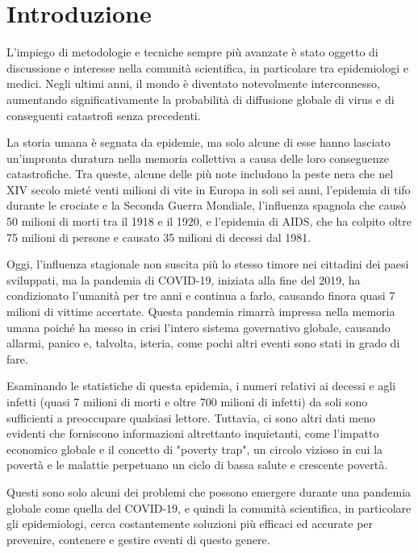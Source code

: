 \section{Introduzione}

L'impiego di metodologie e tecniche sempre più avanzate è stato oggetto 
di discussione e interesse nella comunità scientifica, in particolare tra 
epidemiologi e medici. Negli ultimi anni, il mondo è diventato notevolmente
interconnesso, aumentando significativamente la probabilità di diffusione 
globale di virus e di conseguenti catastrofi senza precedenti.

La storia umana è segnata da epidemie, ma solo alcune di esse hanno 
lasciato un'impronta duratura nella memoria collettiva a causa delle loro 
conseguenze catastrofiche. Tra queste, alcune delle più note includono la 
peste nera che nel XIV secolo mieté venti milioni di vite in Europa in 
soli sei anni, l'epidemia di tifo durante le crociate e la Seconda 
Guerra Mondiale, l'influenza spagnola che causò 50 milioni di morti tra 
il 1918 e il 1920, e l'epidemia di AIDS, che ha colpito oltre 75 milioni 
di persone e causato 35 milioni di decessi dal 1981.

Oggi, l'influenza stagionale non suscita più lo stesso timore nei 
cittadini dei paesi sviluppati, ma la pandemia di COVID-19, iniziata alla 
fine del 2019, ha condizionato l'umanità per tre anni e continua a farlo, 
causando finora quasi 7 milioni di vittime accertate. Questa pandemia 
rimarrà impressa nella memoria umana poiché ha messo in crisi l'intero 
sistema governativo globale, causando allarmi, panico e, talvolta, 
isteria, come pochi altri eventi sono stati in grado di fare.

Esaminando le statistiche di questa epidemia, i numeri relativi ai decessi 
e agli infetti (quasi 7 milioni di morti e oltre 700 milioni di infetti) 
da soli sono sufficienti a preoccupare qualsiasi lettore. Tuttavia, ci 
sono altri dati meno evidenti che forniscono informazioni altrettanto 
inquietanti, come l'impatto economico globale e il concetto di 
"poverty trap", un circolo vizioso in cui la povertà e le malattie 
perpetuano un ciclo di bassa salute e crescente povertà.

Questi sono solo alcuni dei problemi che possono emergere durante una 
pandemia globale come quella del COVID-19, e quindi la comunità 
scientifica, in particolare gli epidemiologi, cerca costantemente 
soluzioni più efficaci ed accurate per prevenire, contenere e gestire 
eventi di questo genere.

